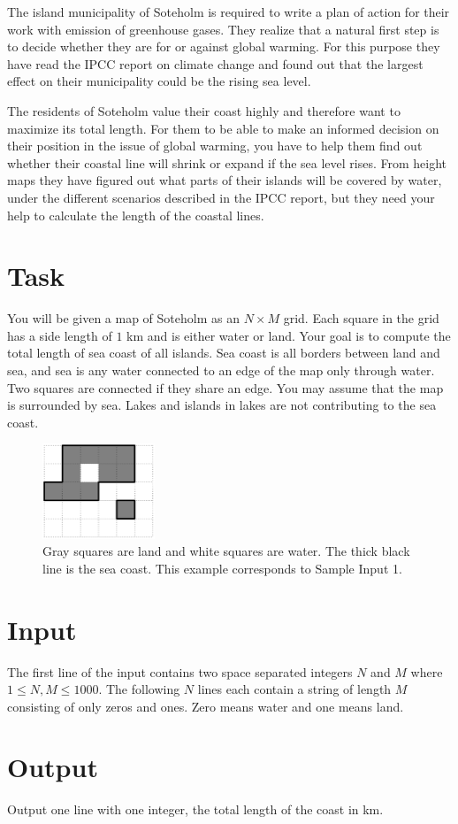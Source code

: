 The island municipality of Soteholm is required to write a plan of action for their work with emission of greenhouse gases. They realize that a natural first step is to decide whether they are for or against global warming.
For this purpose they have read the IPCC report on climate change and found out that the largest effect on their
municipality could be the rising sea level.

The residents of Soteholm value their coast highly and therefore want to maximize its total length. For them
to be able to make an informed decision on their position in the issue of global warming, you have to help them
find out whether their coastal line will shrink or expand if the sea level rises. From height maps they have figured
out what parts of their islands will be covered by water, under the different scenarios described in the IPCC report,
but they need your help to calculate the length of the coastal lines.

\section*{Task}
You will be given a map of Soteholm as an $N \times M$ grid. Each square in the grid has a side length of $1$ km and is
either water or land. Your goal is to compute the total length of sea coast of all islands. Sea coast is all borders
between land and sea, and sea is any water connected to an edge of the map only through water. Two squares are
connected if they share an edge. You may assume that the map is surrounded by sea. Lakes and islands in lakes
are not contributing to the sea coast.

\begin{figure}[h]
    \centering
    \includegraphics[width=0.3\textwidth]{fig.png}
    \caption{Gray squares are land and white squares are water. The thick black line is the sea coast. This example corresponds to Sample Input 1.}
\end{figure}

\section*{Input}
The first line of the input contains two space separated integers $N$ and $M$ where $1 \le N, M \le 1000$.
The following $N$ lines each contain a string of length $M$ consisting of only zeros and ones.
Zero means water and one means land.

\section*{Output}
Output one line with one integer, the total length of the coast in km.
